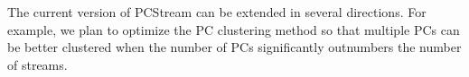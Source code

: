 The current version of \textsf{\small PCStream} can be extended in several directions.  
For example, we plan to optimize the PC clustering method so that
multiple PCs can be better clustered when the number of PCs significantly
outnumbers the number of streams.  
